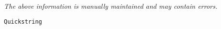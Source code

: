 \label{pkg:quickstring}

{\tiny \it The above information is manually maintained and may contain errors.}
\begin{verbatim}
Quickstring
\end{verbatim}
